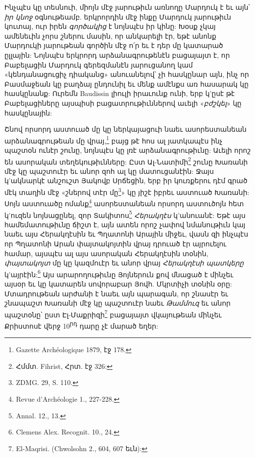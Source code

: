 \documentclass{article}
\begin{document}
{Ինչպէս կը տեսնուի, միոյն մէջ յարութիւն առնողը Մարդուկ է եւ այն՝ \emph{իր կնոջ} օգնութեամբ. երկրորդին մէջ ինքը Մարդուկ յարութիւն կուտայ, ուր իրեն \emph{գործակից} է նոյնպէս իր կինը: Խօսք չկայ ամենեւին չորս շներու մասին, որ անկարելի էր, եթէ անոնք Մարդուկի յարութեան գործին մէջ ո՛ր եւ է դեր մը կատարած ըլլային: Նոյնպէս երկրորդ արձանագրութենէն բացայայտ է, որ Բաբելացին Մարդուկ գերեզմանէն յարուցանող կամ «կենդանացուցիչ դիականց» անուանելով՝ չի հասկընար այն, ինչ որ Բասմաջեան կը բաղձայ ընդունիլ եւ մենք ամէնքս առ հասարակ կը հասկընանք: Ուրեմն Baudissin լիուլի իրաւունք ունի, երբ կ'ըսէ թէ Բաբելացիները այսպիսի բացատրութիւններով աւելի «\emph{բժշկել}» կը հասկընային:

Շնով որսորդ աստուած մը կը ներկայացուի նաեւ ասորեստանեան արձանագրութեան մը վրայ,\footnote{Gazette Archéologique 1879, էջ 178.} բայց թէ հոս ալ յատկապէս ինչ պաշտօն ունէր շունը, նոյնպէս կը լռէ արձանագրութիւնը: Աւելի որոշ են ասորական տեղեկութիւնները: Ըստ Ալ-Նատիմի\footnote{Հմմտ. Fihrist, Հրտ. էջ 326:} շունը Խառանի մէջ կը պաշտուէր եւ անոր զոհ ալ կը մատուցանէին: Ջայս կ'ակնարկէ անշուշտ Յակովբ Սրճեցին, երբ իր կուռքերու դէմ գրած մէկ տաղին մէջ «շներով տէր մը\footnote{ZDMG. 29, S. 110.}» կը յիշէ իբրեւ աստուած Խառանի: Սոյն աստուածը ոմանք\footnote{Revue d'Archéologie 1., 227-228.} ասորեստանեան որսորդ աստուծոյն հետ կ'ուզեն նոյնացընել, զոր Տակիտոս\footnote{Annal. 12., 13.} \emph{Հերակղէս} կ'անուանէ: Եթէ այս համեմատութիւնը ճիշտ է, այն ատեն որոշ չափով նմանութիւն կայ նաեւ այս Հերակղէսին եւ Պղատոնի Արային միջեւ, վասն զի ինչպէս որ Պղատոնի Արան փայտակոյտին վրայ դրուած էր այրուելու համար, այսպէս ալ այս ասորական Հերակղէսին տօնին, \emph{փայտակոյտ} մը կը կազմուէր եւ անոր վրայ \emph{Հերակղէսի պատկերը} կ'այրէին:\footnote{Clemens Alex. Recognit. 10., 24.} Այս արարողութիւնը Յոյներուն քով մնացած է մինչեւ այսօր եւ կը կատարեն սովորաբար Յովհ. Մկրտիչի տօնին օրը: Մտադրութեան արժանի է նաեւ այն պարագան, որ շնասէր եւ շնապաշտ Խառանի մէջ կը պաշտուէր նաեւ \emph{Թամմուզ} եւ անոր պաշտօնը՝ ըստ Էլ-Մաքրիզի\footnote{El-Maqrisi. (Chwolsohn 2., 604, 607 եւն):} բացայայտ վկայութեան մինչեւ Քրիստոսէ վերջ 10\textsuperscript{րդ} դարը չէ մարած եղեր:

}
\end{document}
